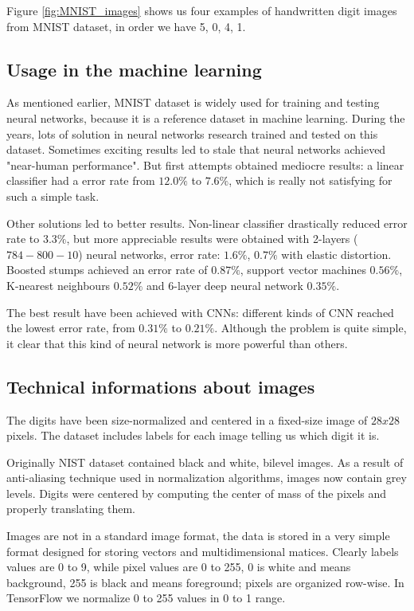 Figure \ref{fig:MNIST_images} shows us four examples of handwritten digit images from MNIST dataset, in order we have 5, 0, 4, 1.

\subsection{Usage in the machine learning}

As mentioned earlier, MNIST dataset is widely used for training and testing neural networks, because it is a reference dataset in machine learning. During the years, lots of solution in neural networks research trained and tested on this dataset. Sometimes exciting results led to stale that neural networks achieved "near-human performance". But first attempts obtained mediocre results: a linear classifier had a error rate from $12.0 \%$ to $7.6 \%$, which is really not satisfying for such a simple task.

Other solutions led to better results. Non-linear classifier drastically reduced error rate to $3.3 \%$, but more appreciable results were obtained with 2-layers ($784-800-10$) neural networks, error rate: $1.6 \%$, $0.7 \%$ with elastic distortion. Boosted stumps achieved an error rate of $0.87 \%$, support vector machines $0.56 \%$, K-nearest neighbours $0.52 \%$ and 6-layer deep neural network $0.35 \%$.

The best result have been achieved with \acsp{CNN}: different kinds of \acs{CNN} reached the lowest error rate, from $0.31 \%$ to $0.21 \%$. Although the problem is quite simple, it clear that this kind of neural network is more powerful than others.

\subsection{Technical informations about images}

The digits have been size-normalized and centered in a fixed-size image of $28x28$ pixels. The dataset includes labels for each image telling us which digit it is.

Originally NIST dataset contained black and white, bilevel images. As a result of anti-aliasing technique used in normalization algorithms, images now contain grey levels. Digits were centered by computing the center of mass of the pixels and properly translating them.

Images are not in a standard image format, the data is stored in a very simple format designed for storing vectors and multidimensional matices. Clearly labels values are 0 to 9, while pixel values are 0 to 255, 0 is white and means background, 255 is black and means foreground; pixels are organized row-wise. In TensorFlow we normalize 0 to 255 values in 0 to 1 range.

